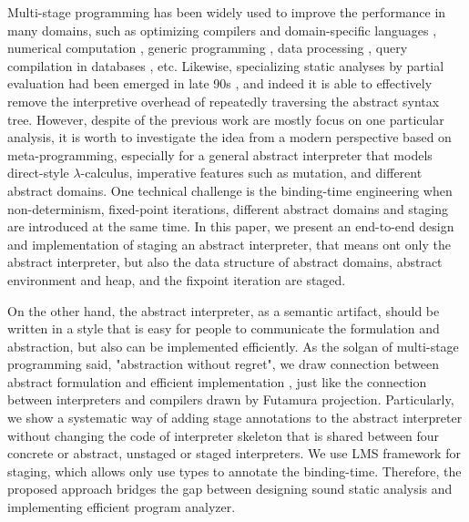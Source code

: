 Multi-stage programming has been widely used to improve the performance in many domains, 
such as optimizing compilers and domain-specific languages \cite{DBLP:conf/pldi/RompfSBLCO14, DBLP:conf/snapl/RompfBLSJAOSKDK15,
DBLP:journals/tecs/SujeethBLRCOO14, DBLP:conf/gpce/SujeethGBLROO13, DBLP:journals/jfp/CaretteKS09},
numerical computation \cite{PGL-038, DBLP:conf/pepm/AktemurKKS13}, 
generic programming \cite{DBLP:journals/pacmpl/Yallop17, Ofenbeck:2017:SGP:3136040.3136060}, 
data processing \cite{DBLP:conf/oopsla/JonnalageddaCSRO14, DBLP:conf/popl/KiselyovBPS17}, 
query compilation in databases \cite{DBLP:conf/osdi/EssertelTDBOR18, DBLP:conf/sigmod/TahboubER18},
etc.
Likewise, specializing static analyses by partial evaluation had been emerged in late 90s 
\cite{damian1999partial, amtoft1999partial, Boucher:1996:ACN:647473.727587, ashley:practical}, 
and indeed it is able to effectively remove the interpretive overhead of 
repeatedly traversing the abstract syntax tree. 
However, despite of the previous work are mostly focus on one particular analysis,
it is worth to investigate the idea from a modern perspective based on meta-programming,
especially for a general abstract interpreter that models direct-style $\lambda$-calculus, imperative 
features such as mutation, and different abstract domains.
One technical challenge is the binding-time engineering when non-determinism, 
fixed-point iterations, different abstract domains and staging are introduced at the same time.
In this paper, we present an end-to-end design and implementation of staging an abstract interpreter,
that means ont only the abstract interpreter, but also the data structure of abstract domains, 
abstract environment and heap, and the fixpoint iteration are staged.

On the other hand, the abstract interpreter, as a semantic artifact, should be written in a 
style that is easy for people to communicate the formulation and abstraction, but also can be implemented 
efficiently. As the solgan of multi-stage programming said, "abstraction without regret",
we draw connection between abstract formulation and efficient implementation ,
just like the connection between interpreters and compilers drawn by Futamura projection.
Particularly, we show a systematic way of adding stage annotations to the abstract interpreter
without changing the code of interpreter skeleton that is shared between four concrete or abstract,
unstaged or staged interpreters. We use LMS framework for staging, which allows only use types to 
annotate the binding-time. Therefore, the proposed approach bridges the gap between designing sound 
static analysis and implementing efficient program analyzer.

